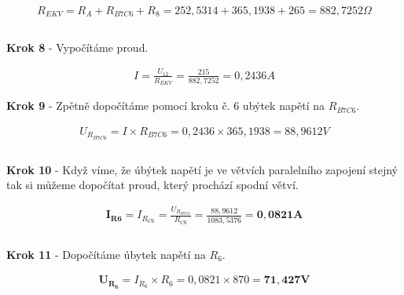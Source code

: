 \begin{gather*}
R_{EKV} = R_A + R_{B7C6} + R_8 = 252,5314 + 365,1938 + 265 = 882,7252 \Omega \\\\
\end{gather*}

\begin{center}
\textbf{Krok 8} - Vypočítáme proud.
\end{center}

\begin{gather*}
I = \frac{U_{12}}{R_{EKV}} = \frac{215}{882,7252} = 0,2436 A
\end{gather*}

\newpage

\begin{center}
\textbf{Krok 9} - Zpětně dopočítáme pomocí kroku č. 6 ubýtek napětí na $R_{B7C6}$.
\end{center}

\begin{gather*}
U_{R_{B7C6}} = I \times R_{B7C6} = 0,2436 \times 365,1938 = 88,9612 V \\\\
\end{gather*}

\begin{center}
\textbf{Krok 10} - Když víme, že úbýtek napětí je ve větvích paralelního zapojení stejný tak si můžeme dopočítat proud, který prochází spodní větví.
\end{center}

\begin{gather*}
\boldsymbol{I_{R6}} = I_{R_{C6}} = \frac{U_{R_{B7C6}}}{R_{C6}} = \frac{88,9612}{1083,5376} = \boldsymbol{0,0821 A} \\\\
\end{gather*}

\begin{center}
\textbf{Krok 11} - Dopočítáme úbytek napětí na $R_{6}$.
\end{center}

\begin{gather*}
\boldsymbol{U_{R_6}} = I_{R_6} \times R_{6} = 0,0821 \times 870 = \boldsymbol{71,427 V} \\\\
\end{gather*}